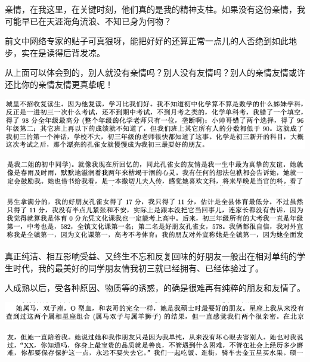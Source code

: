 \documentclass[9pt, b5paper]{article}
\begin{document}
亲情，在我这里，在关键时刻，他们真的是我的精神支柱。如果没有这份亲情，我可能早已在天涯海角流浪、不知已身为何物？

前文中网络专家的贴子可真狠呀，能把好好的还算正常一点儿的人否绝到如此地步，实在是读得后背发凉。

从上面可以体会到的，别人就没有亲情吗？别人没有友情吗？别人的亲情友情或许还比你的亲情友情更真挚呢！

\begin{center}
\includegraphics[width=.9\linewidth]{./pic/backups_plans_20210413_170005.png}
\end{center}

\begin{center}
\includegraphics[width=.9\linewidth]{./pic/backups_plans_20210413_170222.png}
\end{center}

\begin{center}
\includegraphics[width=.9\linewidth]{./pic/backups_plans_20210413_170521.png}
\end{center}

真正纯洁、相互影响受益、又终生不忘和反复回味的好朋友一般出在相对单纯的学生时代，我的最美好的同学朋友情我初三就已经拥有、已经体验过了。

人成熟以后，受各种原因、物质等的诱惑，的确是很难再有纯粹的朋友和友情了。

\begin{center}
\includegraphics[width=.9\linewidth]{./pic/backups_plans_20210413_170728.png}
\end{center}

\begin{center}
\includegraphics[width=.9\linewidth]{./pic/backups_plans_20210413_170800.png}
\end{center}
\end{document}
